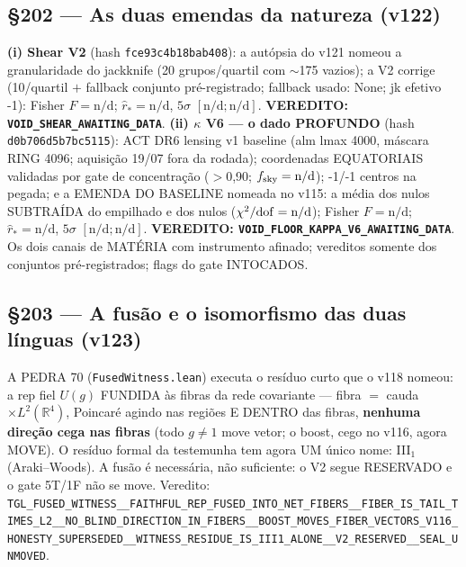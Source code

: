 \documentclass[11pt]{article}
\theoremstyle{definition}\newtheorem{deriv}{Derivação}
\begin{document}
\subsection*{\S202 --- As duas emendas da natureza (v122)}\textbf{(i) Shear V2} (hash \texttt{fce93c4b18bab408}): a autópsia do v121 nomeou a granularidade do jackknife (20 grupos/quartil com $\sim$175 vazios); a V2 corrige (10/quartil $+$ fallback conjunto pré-registrado; fallback usado: None; jk efetivo -1): Fisher $F=\text{n/d}$; $\hat r_*=\text{n/d}$, $5\sigma$ $[\text{n/d};\text{n/d}]$. \textbf{VEREDITO: \texttt{VOID\_SHEAR\_AWAITING\_DATA}}. \textbf{(ii) $\kappa$ V6 --- o dado PROFUNDO} (hash \texttt{d0b706d5b7bc5115}): ACT DR6 lensing v1 baseline (alm lmax 4000, máscara RING 4096; aquisição 19/07 fora da rodada); coordenadas EQUATORIAIS validadas por gate de concentração ($>$0,90; $f_{\rm sky}=\text{n/d}$); -1/-1 centros na pegada; e a EMENDA DO BASELINE nomeada no v115: a média dos nulos SUBTRAÍDA do empilhado e dos nulos ($\chi^2/{\rm dof}=\text{n/d}$); Fisher $F=\text{n/d}$; $\hat r_*=\text{n/d}$, $5\sigma$ $[\text{n/d};\text{n/d}]$. \textbf{VEREDITO: \texttt{VOID\_FLOOR\_KAPPA\_V6\_AWAITING\_DATA}}. Os dois canais de MATÉRIA com instrumento afinado; vereditos somente dos conjuntos pré-registrados; flags do gate INTOCADOS.

\subsection*{\S203 --- A fusão e o isomorfismo das duas línguas (v123)}A PEDRA 70 (\texttt{FusedWitness.lean}) executa o resíduo curto que o v118 nomeou: a rep fiel $U(g)$ FUNDIDA às fibras da rede covariante --- fibra $=$ cauda $\times L^2(\mathbb{R}^4)$, Poincaré agindo nas regiões E DENTRO das fibras, \textbf{nenhuma direção cega nas fibras} (todo $g\neq1$ move vetor; o boost, cego no v116, agora MOVE). O resíduo formal da testemunha tem agora UM único nome: III$_1$ (Araki--Woods). A fusão é necessária, não suficiente: o V2 segue RESERVADO e o gate 5T/1F não se move. Veredito: \texttt{TGL\_FUSED\_WITNESS\_\_FAITHFUL\_REP\_FUSED\_INTO\_NET\_FIBERS\_\_FIBER\_IS\_TAIL\_TIMES\_L2\_\_NO\_BLIND\_DIRECTION\_IN\_FIBERS\_\_BOOST\_MOVES\_FIBER\_VECTORS\_V116\_HONESTY\_SUPERSEDED\_\_WITNESS\_RESIDUE\_IS\_III1\_ALONE\_\_V2\_RESERVED\_\_SEAL\_UNMOVED}.
\end{document}
